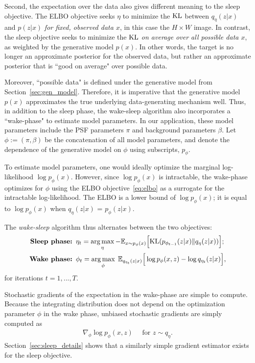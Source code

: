 Second, the expectation over the data also gives different meaning to the sleep objective. The ELBO objective seeks $\eta$ to minimize the $\textrm{KL}$ between $q_\eta(z | x)$ and $p(z | x)$ {\itshape for fixed, observed data $x$},
in this case the $H\times W$ image.
In contrast, the sleep objective seeks to minimize the $\textrm{KL}$ {\itshape on average over all possible data $x$}, as weighted by the generative model $p(x)$. 
In other words, the target is no longer an approximate posterior for the observed data, but rather an approximate posterior that is ``good on average" over possible data.

Moreover, ``possible data" is defined under the generative model from Section~\ref{sec:gen_model}. 
Therefore, it is imperative that the generative model $p(x)$ approximates the true underlying data-generating mechanism well. 
Thus, in addition to the sleep phase, the wake-sleep algorithm also incorporates a ``wake-phase" to estimate model parameters.
In our application, these model parameters include the PSF parameters $\pi$ and background parameters $\beta$. Let 
$\phi:=(\pi, \beta)$ be the concatenation of all model parameters, and denote the dependence of the generative model on $\phi$ using subscripts, $p_\phi$. 

To estimate model parameters, one would ideally optimize the marginal log-likelihood $\log p_\phi(x)$.
However, since $\log p_\phi(x)$ is intractable, the wake-phase optimizes for $\phi$ using the ELBO objective~\eqref{eq:elbo}
as a surrogate for the intractable log-likelihood. 
The ELBO is a lower bound of
$\log p_\phi(x)$; 
it is equal to $\log p_\phi(x)$ when $q_\eta(z | x)$ 
= $p_\phi(z | x)$. 

The {\itshape wake-sleep} algorithm thus alternates between the two objectives: 
\begin{align}
    \text{{\bf Sleep phase: }} & 
    \eta_{t} = \operatorname*{arg\,max}_{\eta} -\mathbb{E}_{x \sim p_\phi(x)}\Big[\textrm{KL}(p_{\phi_{t-1}}(z | x) \| q_\eta(z | x))\Big]
    \label{eq:sleep_phase_summary}; 
    \\
    \text{{\bf Wake phase: }} & \phi_{t} = \operatorname*{arg\,max}_{\phi}\; \mathbb{E}_{q_{\eta_t}(z | x)}\Big[\log p_{\phi}(x, z) - \log q_{\eta_t}(z | x)\Big],
    \label{eq:wake_phase_summary}
\end{align} 
for iterations $t = 1, ..., T$. 

Stochastic gradients of the expectation in the wake-phase are simple to compute. Because the integrating distribution does not depend on the optimization parameter $\phi$ in the wake phase, unbiased stochastic gradients are simply computed as 
\begin{align}
    \nabla_\phi \log p_\phi(x, z) \quad \text{ for } z\sim q_\eta. 
    \label{eq:mstep_grad}
\end{align}
Section~\ref{sec:sleep_details} shows that a similarly simple gradient estimator exists for the sleep objective.


